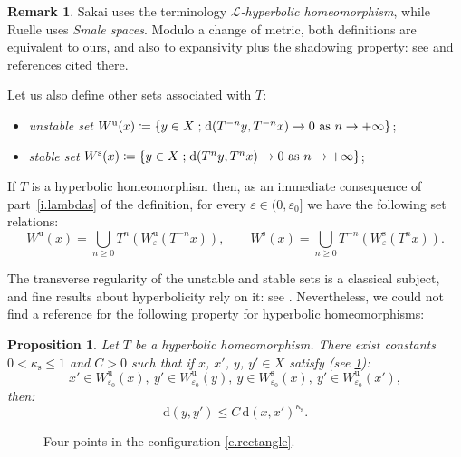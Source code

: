 \documentclass[10pt]{amsart}
\let\mathcal\mathscr
\def\vcentcolon{\mathrel{\mathop\ordinarycolon}}
\providecommand\ordinarycolon{:}
\providecommand*\coloneqq{\vcentcolon\mathrel{\mkern-1.2mu}=}
\theoremstyle{plain}
\newtheorem{proposition}[theorem]{Proposition}
\theoremstyle{definition}
\newtheorem{remark}[theorem]{Remark}
\newcommand{\st}{\;\mathord{;}\;}
\newcommand{\dd}{\mathrm{d}}
\newcommand{\uu}{\mathrm{u}}
\renewcommand{\ss}{\mathrm{s}}
\let\epsilon\varepsilon
\begin{document}
\begin{remark}\label{r.hyperb}
Sakai \cite{Sakai} uses the terminology \emph{$\mathcal{L}$-hyperbolic homeomorphism}, while Ruelle \cite{Ruelle} uses \emph{Smale spaces}. Modulo a change of metric, both definitions are equivalent to ours, and also to expansivity plus the shadowing property: see \cite{Sakai} and references cited there.
\end{remark}

Let us also define other sets associated with $T$:
\begin{itemize}
\item \emph{unstable set} $W^\uu(x) \coloneqq \left\{ y \in X \st \dd(T^{-n} y, T^{-n} x) \to 0 \text{ as } n \to +\infty \right\}$;
\item \emph{stable set} $W^\ss(x) \coloneqq \left\{ y \in X \st \dd(T^{n} y, T^{n} x) \to 0 \text{ as } n \to +\infty \right\}$;
\end{itemize}
If $T$ is a hyperbolic homeomorphism then, as an immediate consequence of part~\eqref{i.lambdas} of the definition, for every $\epsilon \in (0,\epsilon_0]$ we have the following set relations:
\begin{equation}\label{e.longW}
W^\uu(x) = \bigcup_{n\ge 0} T^n(W^\uu_\epsilon(T^{-n} x)), \qquad
W^\ss(x) = \bigcup_{n\ge 0} T^{-n}(W^\ss_\epsilon(T^n x)).
\end{equation}

The transverse regularity of the unstable and stable sets is a classical subject, and fine results about hyperbolicity rely on it: see \cite[Chap.\,19]{KH}.
Nevertheless, we could not find a reference for the following property for hyperbolic homeomorphisms:

\begin{proposition}\label{p.regularity_base}
Let $T$ be a hyperbolic homeomorphism.
There exist constants $0 < \kappa_\ss \le 1$ and $C>0$ such that
if $x$, $x'$, $y$, $y' \in X$ satisfy (see \cref{f.rectangle}):
\begin{equation}\label{e.rectangle}
x' \in W^\uu_{\epsilon_0}(x), \
y' \in W^\uu_{\epsilon_0}(y), \
y \in W^\ss_{\epsilon_0}(x), \
y' \in W^\uu_{\epsilon_0}(x'),
\end{equation}
then:
\[
\dd(y,y') \le C \, \dd(x, x')^{\kappa_\ss}.
\]
\end{proposition}

\begin{figure}[hbt]
	\begin{center}
	\caption{Four points in the configuration \eqref{e.rectangle}.}
	\label{f.rectangle}
	\end{center}
\end{figure}
\end{document}
